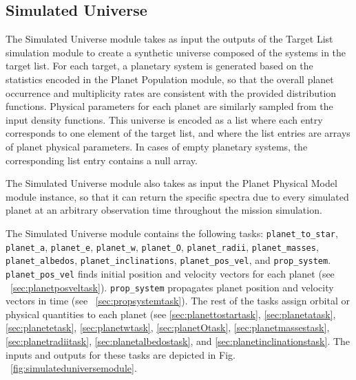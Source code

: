 \documentclass[cleanfoot]{asme2ej}
\begin{document}
\subsection{Simulated Universe} \label{sec:simulateduniverse}
The Simulated Universe module takes as input the outputs of the Target List simulation module to create a synthetic universe composed of the systems in the target list.  For each target, a planetary system is generated based on the statistics encoded in the Planet Population module, so that the overall planet occurrence and multiplicity rates are consistent with the provided distribution functions.  Physical parameters for each planet are similarly sampled from the input density functions.  This universe is encoded as a list where each entry corresponds to one element of the target list, and where the list entries are arrays of planet physical parameters.  In cases of empty planetary systems, the corresponding list entry contains a null array.

The Simulated Universe module also takes as input the Planet Physical Model module instance, so that it can return the specific spectra due to every simulated planet at an arbitrary observation time throughout the mission simulation.

The Simulated Universe module contains the following tasks: \verb+planet_to_star+, \verb+planet_a+, \verb+planet_e+, \verb+planet_w+, \verb+planet_O+, \verb+planet_radii+, \verb+planet_masses+, \verb+planet_albedos+, \verb+planet_inclinations+, \verb+planet_pos_vel+, and \verb+prop_system+.  \verb+planet_pos_vel+ finds initial position and velocity vectors for each planet (see ~\ref{sec:planetposveltask}).  \verb+prop_system+ propagates planet position and velocity vectors in time (see ~\ref{sec:propsystemtask}).  The rest of the tasks assign orbital or physical quantities to each planet (see \ref{sec:planettostartask}, \ref{sec:planetatask}, \ref{sec:planetetask}, \ref{sec:planetwtask}, \ref{sec:planetOtask}, \ref{sec:planetmassestask}, \ref{sec:planetradiitask}, \ref{sec:planetalbedostask}, and \ref{sec:planetinclinationstask}. The inputs and outputs for these tasks are depicted in Fig. ~\ref{fig:simulateduniversemodule}.
\end{document}
